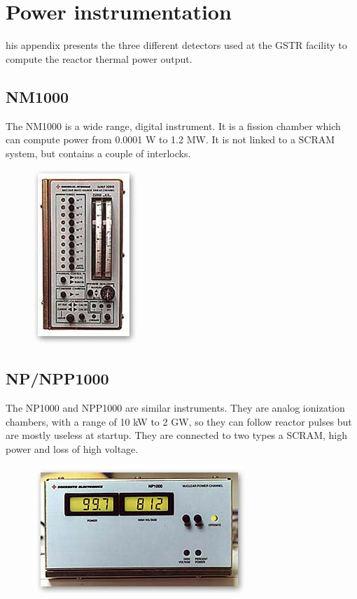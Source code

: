 %
%

\chapter{Power instrumentation}
\label{app:app03}

his appendix presents the three different detectors used at the GSTR facility to compute the reactor thermal power output.

\section{NM1000}
The NM1000 is a wide range, digital instrument. It is a fission chamber which can compute power from 0.0001 W to 1.2 MW. It is not linked to a SCRAM system, but contains a couple of interlocks.


\begin{figure}[!t]
	\centering
	\includegraphics[height=0.4\textheight]{figa/nm1000}
	\label{fig:nm1000}
\end{figure}


\section{NP/NPP1000}

The NP1000 and NPP1000 are similar instruments. They are analog ionization chambers, with a range of 10 kW to 2 GW, so they can follow reactor pulses but are mostly useless at startup. They are connected to two types a SCRAM, high power and loss of high voltage.

\begin{figure}[!t]
	\centering
	\includegraphics[height=0.4\textheight]{figa/np1000}
	\label{fig:np1000}
\end{figure}


\
